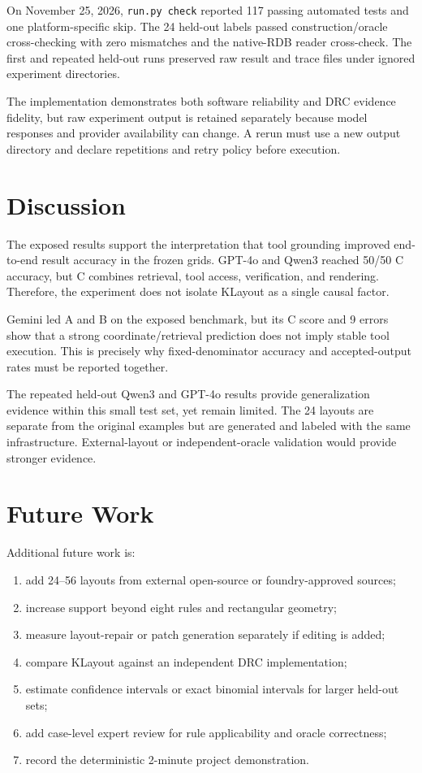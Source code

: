 \documentclass[10pt,twocolumn]{article}
\begin{document}
On November 25, 2026, \texttt{run.py check} reported 117 passing automated tests and
one platform-specific skip. The 24 held-out labels passed construction/oracle cross-checking with zero
mismatches and the native-RDB reader cross-check. The first and repeated held-out
runs preserved raw result and trace files under ignored experiment directories.

The implementation demonstrates both software reliability and DRC evidence fidelity,
but raw experiment output is retained separately because model responses and provider
availability can change. A rerun must use a new output directory and declare
repetitions and retry policy before execution.

\clearpage
\section{Discussion}
The exposed results support the interpretation that tool grounding improved
end-to-end result accuracy in the frozen grids. GPT-4o and Qwen3 reached 50/50 C
accuracy, but C combines retrieval, tool access, verification, and rendering.
Therefore, the experiment does not isolate KLayout as a single causal factor.

Gemini led A and B on the exposed benchmark, but its C score and 9 errors show
that a strong coordinate/retrieval prediction does not imply stable tool execution.
This is precisely why fixed-denominator accuracy and accepted-output rates must
be reported together.

The repeated held-out Qwen3 and GPT-4o results provide generalization evidence
within this small test set, yet remain limited. The 24 layouts are separate from
the original examples but are generated and labeled with the same infrastructure.
External-layout or independent-oracle validation would provide stronger evidence.

\section{Future Work}
Additional future work is:
\begin{enumerate}[leftmargin=*,itemsep=1pt]
\item add 24--56 layouts from external open-source or foundry-approved sources;
\item increase support beyond eight rules and rectangular geometry;
\item measure layout-repair or patch generation separately if editing is added;
\item compare KLayout against an independent DRC implementation;
\item estimate confidence intervals or exact binomial intervals for larger held-out sets;
\item add case-level expert review for rule applicability and oracle correctness;
\item record the deterministic 2-minute project demonstration.
\end{enumerate}
\end{document}
